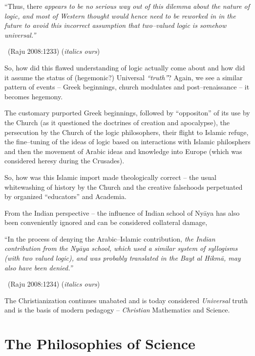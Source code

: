 \begin{myquote}
“Thus, there \textit{appears to be no serious way out of this dilemma about the nature of logic, and most of Western thought would hence need to be reworked in in the future to avoid this incorrect assumption that two–valued logic is somehow universal.”} 

~\hfill (Raju 2008:1233) (\textit{italics ours})
\end{myquote}

So, how did this flawed understanding of logic actually come about and how did it assume the status of (hegemonic?) Universal \textit{“truth”}? Again, we see a similar pattern of events – Greek beginnings, church modulates and post–renaissance – it becomes hegemony.

The customary purported Greek beginnings, followed by “oppositon” of its use by the Church (as it questioned the doctrines of creation and apocalypse), the persecution by the Church of the logic philosophers, their flight to Islamic refuge, the fine–tuning of the ideas of logic based on interactions with Islamic philosphers and then the movement of Arabic ideas and knowledge into Europe (which was considered heresy during the Crusades).

So, how was this Islamic import made theologically correct – the usual whitewashing of history by the Church and the creative falsehoods perpetuated by organized “educators” and Academia.

From the Indian perspective – the influence of Indian school of Nyāya has also been conveniently ignored and can be considered collateral damage,

\begin{myquote}
“In the process of denying the Arabic–Islamic contribution, \textit{the Indian contribution from the Nyāya school, which used a similar system of syllogisms (with two valued logic), and was probably translated in the Bayt al Hikmā, may also have been denied.”} 

~\hfill (Raju 2008:1234) (\textit{italics ours})
\end{myquote}

The Christianization continues unabated and is today considered \textit{Universal} truth and is the basis of modern pedagogy – \textit{Christian} Mathematics and Science.


\section*{The Philosophies of Science}

